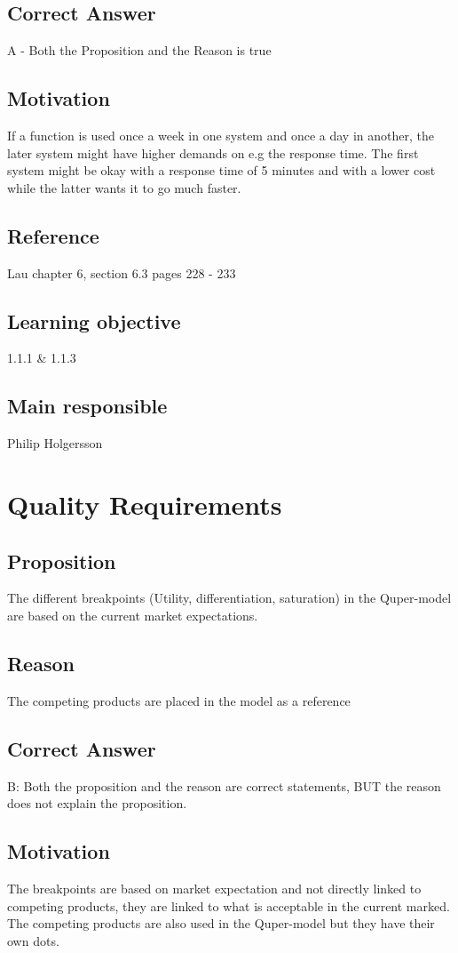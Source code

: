 \documentclass[a4paper]{article}
\begin{document}
\subsection*{Correct Answer}
A - Both the Proposition and the Reason is true
\subsection*{Motivation}
If a function is used once a week in one system and once a day in another, the later system might have higher demands on e.g the response time. The first system might be okay with a response time of 5 minutes and with a lower cost while the latter wants it to go much faster. 
\subsection*{Reference}
Lau chapter 6, section 6.3 pages 228 - 233
\subsection*{Learning objective}
1.1.1 \& 1.1.3
\subsection*{Main responsible}
Philip Holgersson

\section{Quality Requirements}
\subsection*{Proposition}
The different breakpoints (Utility, differentiation, saturation) in the Quper-model are based on the current market expectations.
\subsection*{Reason}
The competing products are placed in the model as a reference
\subsection*{Correct Answer}
B: Both the proposition and the reason are correct statements, BUT the reason does not explain the proposition.
\subsection*{Motivation}
The breakpoints are based on market expectation and not directly linked to competing products, they are linked to what is acceptable in the current marked. The competing products are also used in the Quper-model but they have their own dots.
\end{document}
